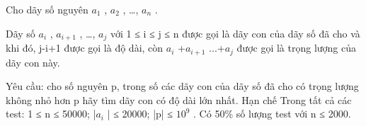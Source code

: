 Cho dãy số nguyên $a_{1}$   , $a_{2}$   , …, $a_{n}$   .  

   Dãy số $a_{i}$   , $a_{i+1}$   , …, $a_{j}$   với 1 ≤ i ≤ j ≤ n được gọi là dãy con của dãy số đã cho và khi đó, j-i+1 được gọi là độ dài, còn   $a_{i}$   +$a_{i+1}$   ...+$a_{j}$   được gọi là trọng lượng của dãy con này.  

   Yêu cầu: cho số nguyên p, trong số các dãy con của dãy số đã cho có trọng lượng không nhỏ hơn p hãy tìm dãy con có độ dài lớn nhất.
   Hạn chế  
Trong tất cả các test: 1 ≤ n ≤ 50000;  |$a_{i}$   | ≤ 20000; |p| ≤ $10^{9}$   . Có 50\% số lượng test với n ≤ 2000.